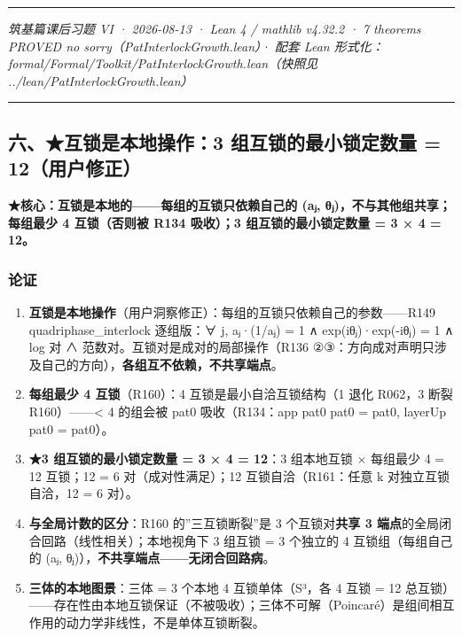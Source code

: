\documentclass[
]{article}
\providecommand{\tightlist}{%
  \setlength{\itemsep}{0pt}\setlength{\parskip}{0pt}}
\begin{document}
\begin{center}\rule{0.5\linewidth}{0.5pt}\end{center}

\emph{筑基篇课后习题 VI · 2026-08-13 · Lean 4 / mathlib v4.32.2 · 7
theorems PROVED no sorry（PatInterlockGrowth.lean）· 配套 Lean
形式化：formal/Formal/Toolkit/PatInterlockGrowth.lean（快照见
../lean/PatInterlockGrowth.lean）}

\begin{center}\rule{0.5\linewidth}{0.5pt}\end{center}

\subsection{六、★互锁是本地操作：3 组互锁的最小锁定数量 =
12（用户修正）}\label{ux516dux4e92ux9501ux662fux672cux5730ux64cdux4f5c3-ux7ec4ux4e92ux9501ux7684ux6700ux5c0fux9501ux5b9aux6570ux91cf-12ux7528ux6237ux4feeux6b63}

\textbf{★核心：互锁是本地的------每组的互锁只依赖自己的 (aⱼ,
θⱼ)，不与其他组共享；每组最少 4 互锁（否则被 R134 吸收）；3
组互锁的最小锁定数量 = 3 × 4 = 12。}

\subsubsection{论证}\label{ux8bbaux8bc1-2}

\begin{enumerate}
\def\labelenumi{\arabic{enumi}.}
\tightlist
\item
  \textbf{互锁是本地操作}（用户洞察修正）：每组的互锁只依赖自己的参数------R149
  quadriphase\_interlock 逐组版：∀ j, aⱼ·(1/aⱼ) = 1 ∧ exp(iθⱼ)·exp(-iθⱼ)
  = 1 ∧ log 对 ∧ 范数对。互锁对是成对的局部操作（R136
  ②③：方向成对声明只涉及自己的方向），\textbf{各组互不依赖，不共享端点}。
\item
  \textbf{每组最少 4 互锁}（R160）：4 互锁是最小自洽互锁结构（1 退化
  R062，3 断裂 R160）------\textless{} 4 的组会被 pat0 吸收（R134：app
  pat0 pat0 = pat0, layerUp pat0 = pat0）。
\item
  \textbf{★3 组互锁的最小锁定数量 = 3 × 4 = 12}：3 组本地互锁 × 每组最少
  4 = 12 互锁；12 = 6 对（成对性满足）；12 互锁自洽（R161：任意 k
  对独立互锁自洽，12 = 6 对）。
\item
  \textbf{与全局计数的区分}：R160 的''三互锁断裂''是 3
  个互锁对\textbf{共享 3 端点}的全局闭合回路（线性相关）；本地视角下 3
  组互锁 = 3 个独立的 4 互锁组（每组自己的 (aⱼ,
  θⱼ)），\textbf{不共享端点------无闭合回路病}。
\item
  \textbf{三体的本地图景}：三体 = 3 个本地 4 互锁单体（S³，各 4 互锁 =
  12
  总互锁）------存在性由本地互锁保证（不被吸收）；三体不可解（Poincaré）是组间相互作用的动力学非线性，不是单体互锁断裂。
\end{enumerate}
\end{document}
